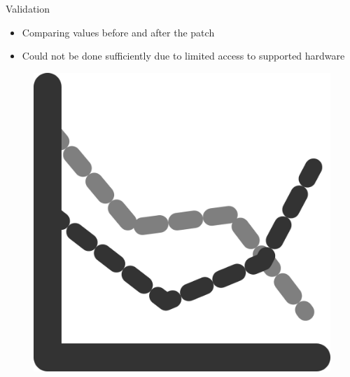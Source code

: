 \documentclass[aspectratio=169]{beamer}
[aspectratio=169] %
\begin{document}
\begin{frame}{Validation}
  \begin{minipage}{0.49\textwidth} 
    \begin{itemize}
      \item Comparing values before and after the patch
      \item Could not be done sufficiently due to limited access to supported hardware
    \end{itemize}
  \end{minipage}
  \hfill
  \begin{minipage}{0.49\textwidth} 
    \begin{figure}
      \centering
      \includegraphics[height=0.5\textheight]{figures/graph.png}
    \end{figure}
  \end{minipage}
\end{frame}

\section*{}
\end{document}
